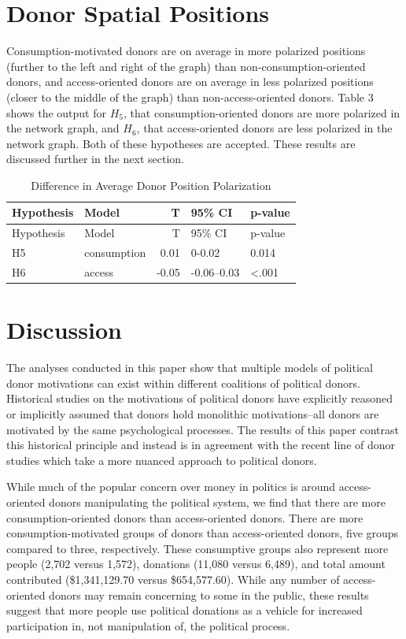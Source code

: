 \documentclass[12pt,]{article}
\begin{document}
\hypertarget{donor-spatial-positions}{%
\section{Donor Spatial Positions}\label{donor-spatial-positions}}

Consumption-motivated donors are on average in more polarized positions
(further to the left and right of the graph) than
non-consumption-oriented donors, and access-oriented donors are on
average in less polarized positions (closer to the middle of the graph)
than non-access-oriented donors. Table 3 shows the output for \(H_{5}\),
that consumption-oriented donors are more polarized in the network
graph, and \(H_{6}\), that access-oriented donors are less polarized in
the network graph. Both of these hypotheses are accepted. These results
are discussed further in the next section.

\begin{longtable}[]{@{}llrll@{}}
\caption{Difference in Average Donor Position
Polarization}\tabularnewline
\toprule
Hypothesis & Model & T & 95\% CI & p-value\tabularnewline
\midrule
\endfirsthead
\toprule
Hypothesis & Model & T & 95\% CI & p-value\tabularnewline
\midrule
\endhead
H5 & consumption & 0.01 & 0-0.02 & 0.014\tabularnewline
H6 & access & -0.05 & -0.06--0.03 & \textless.001\tabularnewline
\bottomrule
\end{longtable}

\hypertarget{discussion}{%
\section{Discussion}\label{discussion}}

The analyses conducted in this paper show that multiple models of
political donor motivations can exist within different coalitions of
political donors. Historical studies on the motivations of political
donors have explicitly reasoned or implicitly assumed that donors hold
monolithic motivations--all donors are motivated by the same
psychological processes. The results of this paper contrast this
historical principle and instead is in agreement with the recent line of
donor studies which take a more nuanced approach to political donors.

While much of the popular concern over money in politics is around
access-oriented donors manipulating the political system, we find that
there are more consumption-oriented donors than access-oriented donors.
There are more consumption-motivated groups of donors than
access-oriented donors, five groups compared to three, respectively.
These consumptive groups also represent more people (2,702 versus
1,572), donations (11,080 versus 6,489), and total amount contributed
(\$1,341,129.70 versus \$654,577.60). While any number of
access-oriented donors may remain concerning to some in the public,
these results suggest that more people use political donations as a
vehicle for increased participation in, not manipulation of, the
political process.
\end{document}
